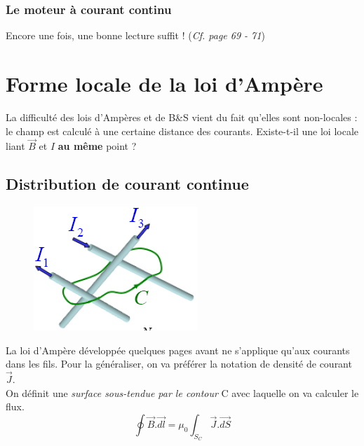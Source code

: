 \documentclass	[11pt, a4paper, openany]{book}
\begin{document}
\subsubsection{Le moteur à courant continu}
Encore une fois, une bonne lecture suffit ! (\textit{Cf. page 69 - 71})

\section{Forme locale de la loi d'Ampère}
La difficulté des lois d'Ampères et de B\&S vient du fait qu'elles sont non-locales : le champ est calculé à une certaine distance des courants. Existe-t-il une loi locale liant $\vec{B}$ et $I$ \textbf{au même} point ?

\subsection{Distribution de courant continue}
\begin{figure}
	\includegraphics[scale=0.50]{magneto/image15.png}
\end{figure}

La loi d'Ampère développée quelques pages avant ne s'applique qu'aux courants dans les fils. Pour la généraliser, on va préférer la notation de densité de courant $\vec{J}$.\\





On définit une \textit{surface sous-tendue par le contour} C avec laquelle on va calculer le flux.
\begin{equation}
	\oint \vec{B}.\vec{dl} = \mu_0 \int_{S_C} \vec{J}.\vec{dS}
\end{equation}
\end{document}
